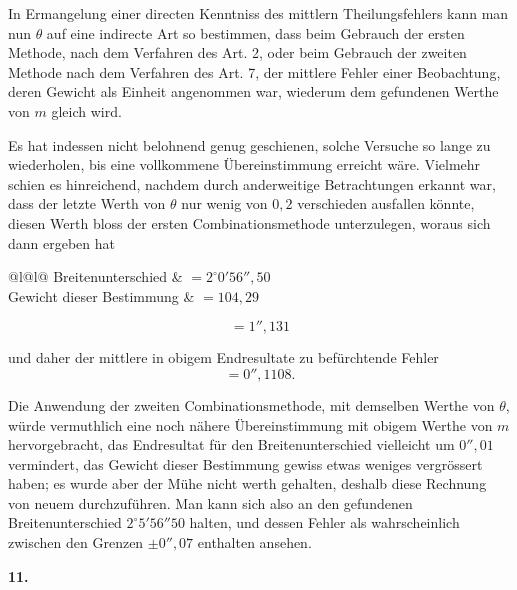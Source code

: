 In Ermangelung einer directen Kenntniss des mittlern Theilungsfehlers
kann man nun \(\theta\) auf eine indirecte Art so bestimmen, dass beim Gebrauch
der ersten Methode, nach dem Verfahren des Art. 2, oder beim Gebrauch
der zweiten Methode nach dem Verfahren des Art. 7, der mittlere Fehler
einer Beobachtung, deren Gewicht als Einheit angenommen war, wiederum
dem gefundenen Werthe von \(m\) gleich wird.

Es hat indessen nicht belohnend genug geschienen, solche Versuche so
lange zu wiederholen, bis eine vollkommene Übereinstimmung erreicht wäre.
Vielmehr schien es hinreichend, nachdem durch anderweitige Betrachtungen
erkannt war, dass der letzte Werth von \(\theta\) nur wenig von \(0{,}2\) verschieden
ausfallen könnte, diesen Werth bloss der ersten Combinationsmethode unterzulegen,
woraus sich dann ergeben hat
\begin{center}
\begin{tabular}{@{}l@{\quad}l@{}}
Breitenunterschied & \(=2^\circ0'56''{,}50\)\\
Gewicht dieser Bestimmung & \(=104{,}29\)\\
\end{tabular}
\end{center}
\[
=1''{,}131
\]

\par\clearpage
\noindent\makebox[12mm][l]{}\par\medskip

\noindent und daher der mittlere in obigem Endresultate zu befürchtende Fehler
\[
=0''{,}1108.
\]

Die Anwendung der zweiten Combinationsmethode, mit demselben Werthe
von \(\theta\), würde vermuthlich eine noch nähere Übereinstimmung mit obigem
Werthe von \(m\) hervorgebracht, das Endresultat für den Breitenunterschied
vielleicht um \(0''{,}01\) vermindert, das Gewicht dieser Bestimmung gewiss etwas
weniges vergrössert haben; es wurde aber der Mühe nicht werth gehalten,
deshalb diese Rechnung von neuem durchzuführen. Man kann sich also an
den gefundenen Breitenunterschied \(2^\circ5'56''50\) halten, und dessen Fehler als
wahrscheinlich zwischen den Grenzen \(\pm0''{,}07\) enthalten ansehen.

\begin{center}\textbf{11.}\end{center}

